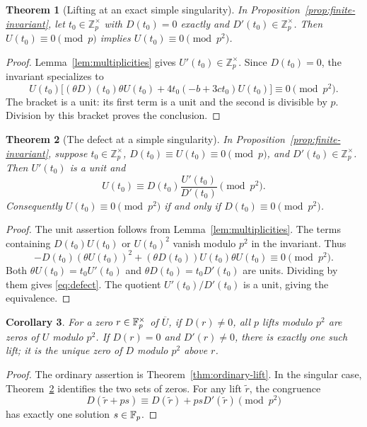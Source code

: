 \documentclass[11pt,a4paper]{article}
\newtheorem{theorem}{Theorem}[section]
\newtheorem{corollary}[theorem]{Corollary}
\theoremstyle{remark}
\newcommand{\Z}{\mathbb Z}\newcommand{\Q}{\mathbb Q}
\begin{document}
\begin{theorem}[Lifting at an exact simple singularity]
\label{thm:exact-singular-lift}
In Proposition~\ref{prop:finite-invariant}, let $t_0\in\Z_p^\times$
with $D(t_0)=0$ exactly and $D'(t_0)\in\Z_p^\times$. Then
$U(t_0)\equiv0\pmod p$ implies $U(t_0)\equiv0\pmod{p^2}$.
\end{theorem}
\begin{proof}
Lemma~\ref{lem:multiplicities} gives $U'(t_0)\in\Z_p^\times$.
Since $D(t_0)=0$, the invariant specializes to
\[
 U(t_0)\bigl[(\theta D)(t_0)\theta U(t_0)
              +4t_0(-b+3ct_0)U(t_0)\bigr]\equiv0\pmod{p^2}.
\]
The bracket is a unit: its first term is a unit and the second is
divisible by $p$. Division by this bracket proves the conclusion.
\end{proof}

\begin{theorem}[The defect at a simple singularity]\label{thm:defect}
In Proposition~\ref{prop:finite-invariant}, suppose $t_0\in\Z_p^\times$,
$D(t_0)\equiv U(t_0)\equiv0\pmod p$, and
$D'(t_0)\in\Z_p^\times$. Then $U'(t_0)$ is a unit and
\begin{equation}\label{eq:defect}
 U(t_0)\equiv D(t_0)\frac{U'(t_0)}{D'(t_0)}\pmod{p^2}.
\end{equation}
Consequently $U(t_0)\equiv0\pmod{p^2}$ if and only if
$D(t_0)\equiv0\pmod{p^2}$.
\end{theorem}
\begin{proof}
The unit assertion follows from Lemma~\ref{lem:multiplicities}.
The terms containing $D(t_0)U(t_0)$ or $U(t_0)^2$ vanish modulo $p^2$
in the invariant. Thus
\[
 -D(t_0)(\theta U(t_0))^2
 +(\theta D(t_0))U(t_0)\theta U(t_0)\equiv0\pmod{p^2}.
\]
Both $\theta U(t_0)=t_0U'(t_0)$ and
$\theta D(t_0)=t_0D'(t_0)$ are units. Dividing by them gives
\eqref{eq:defect}. The quotient $U'(t_0)/D'(t_0)$ is a unit, giving
the equivalence.
\end{proof}

\begin{corollary}\label{cor:root-discs}
For a zero $r\in\mathbb F_p^\times$ of $\overline U$, if $D(r)\ne0$, all
$p$ lifts modulo $p^2$ are zeros of $U$ modulo $p^2$.
If $D(r)=0$ and $D'(r)\ne0$, there is exactly one such lift; it is
the unique zero of $D$ modulo $p^2$ above $r$.
\end{corollary}
\begin{proof}
The ordinary assertion is Theorem~\ref{thm:ordinary-lift}.
In the singular case, Theorem~\ref{thm:defect} identifies the two sets
of zeros. For any lift $\widetilde r$, the congruence
\[
 D(\widetilde r+ps)\equiv D(\widetilde r)+psD'(\widetilde r)
 \pmod{p^2}
\]
has exactly one solution $s\in\mathbb F_p$.
\end{proof}
\end{document}
